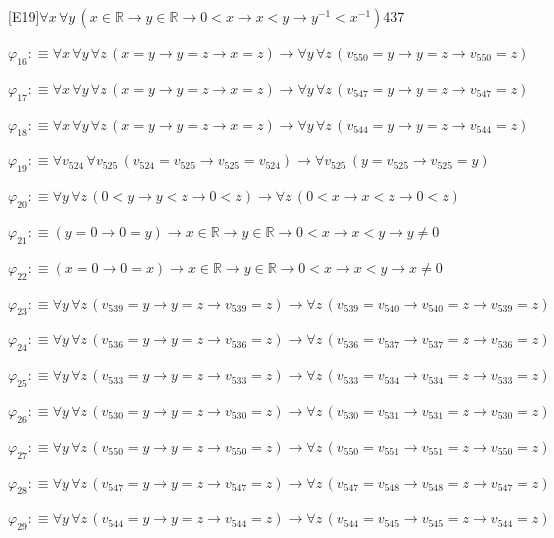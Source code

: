 \begin{fullproof}{[E19]}{$\forall x\,\forall y\,(x \in \mathbb{R} \to y \in \mathbb{R} \to 0 < x \to x < y \to y^{-1} < x^{-1})$}{437}
\begin{abbrevlist}
\item $\varphi_{16} :\equiv \forall x\,\forall y\,\forall z\,(x = y \to y = z \to x = z) \to \forall y\,\forall z\,(v_{550} = y \to y = z \to v_{550} = z)$
\item $\varphi_{17} :\equiv \forall x\,\forall y\,\forall z\,(x = y \to y = z \to x = z) \to \forall y\,\forall z\,(v_{547} = y \to y = z \to v_{547} = z)$
\item $\varphi_{18} :\equiv \forall x\,\forall y\,\forall z\,(x = y \to y = z \to x = z) \to \forall y\,\forall z\,(v_{544} = y \to y = z \to v_{544} = z)$
\item $\varphi_{19} :\equiv \forall v_{524}\,\forall v_{525}\,(v_{524} = v_{525} \to v_{525} = v_{524}) \to \forall v_{525}\,(y = v_{525} \to v_{525} = y)$
\item $\varphi_{20} :\equiv \forall y\,\forall z\,(0 < y \to y < z \to 0 < z) \to \forall z\,(0 < x \to x < z \to 0 < z)$
\item $\varphi_{21} :\equiv (y = 0 \to 0 = y) \to x \in \mathbb{R} \to y \in \mathbb{R} \to 0 < x \to x < y \to y \neq 0$
\item $\varphi_{22} :\equiv (x = 0 \to 0 = x) \to x \in \mathbb{R} \to y \in \mathbb{R} \to 0 < x \to x < y \to x \neq 0$
\item $\varphi_{23} :\equiv \forall y\,\forall z\,(v_{539} = y \to y = z \to v_{539} = z) \to \forall z\,(v_{539} = v_{540} \to v_{540} = z \to v_{539} = z)$
\item $\varphi_{24} :\equiv \forall y\,\forall z\,(v_{536} = y \to y = z \to v_{536} = z) \to \forall z\,(v_{536} = v_{537} \to v_{537} = z \to v_{536} = z)$
\item $\varphi_{25} :\equiv \forall y\,\forall z\,(v_{533} = y \to y = z \to v_{533} = z) \to \forall z\,(v_{533} = v_{534} \to v_{534} = z \to v_{533} = z)$
\item $\varphi_{26} :\equiv \forall y\,\forall z\,(v_{530} = y \to y = z \to v_{530} = z) \to \forall z\,(v_{530} = v_{531} \to v_{531} = z \to v_{530} = z)$
\item $\varphi_{27} :\equiv \forall y\,\forall z\,(v_{550} = y \to y = z \to v_{550} = z) \to \forall z\,(v_{550} = v_{551} \to v_{551} = z \to v_{550} = z)$
\item $\varphi_{28} :\equiv \forall y\,\forall z\,(v_{547} = y \to y = z \to v_{547} = z) \to \forall z\,(v_{547} = v_{548} \to v_{548} = z \to v_{547} = z)$
\item $\varphi_{29} :\equiv \forall y\,\forall z\,(v_{544} = y \to y = z \to v_{544} = z) \to \forall z\,(v_{544} = v_{545} \to v_{545} = z \to v_{544} = z)$

\end{abbrevlist}
\end{fullproof}
